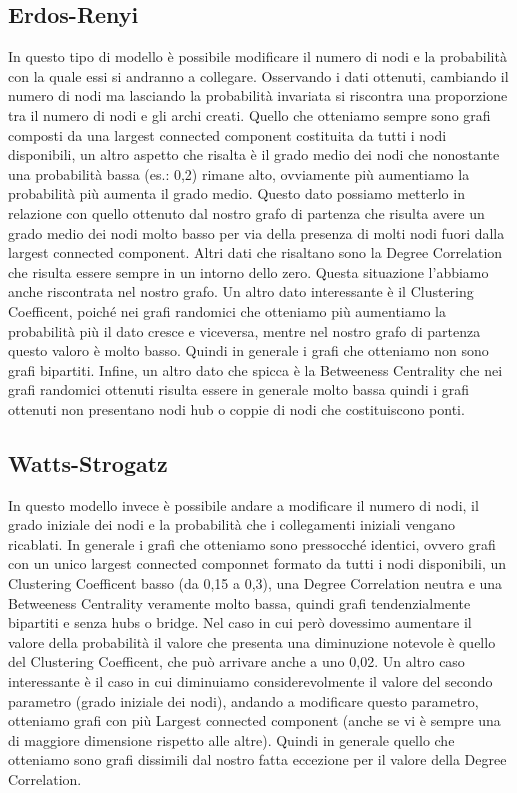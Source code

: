 \documentclass[a4paper]{article}
\begin{document}
\subsection{Erdos-Renyi}
In questo tipo di modello è possibile modificare il numero di nodi e la probabilità con la quale essi si andranno a collegare. Osservando i dati ottenuti, cambiando il numero di nodi ma lasciando la probabilità invariata si riscontra una proporzione tra il numero di nodi e gli archi creati. Quello che otteniamo sempre sono grafi composti da una largest connected component costituita da tutti i nodi disponibili, un altro aspetto che risalta è il grado medio dei nodi che nonostante una probabilità bassa (es.: 0,2) rimane alto, ovviamente più aumentiamo la probabilità più aumenta il grado medio. Questo dato possiamo metterlo in relazione con quello ottenuto dal nostro grafo di partenza che risulta avere un grado medio dei nodi molto basso per via della presenza di molti nodi fuori dalla largest connected component.
Altri dati che risaltano sono la Degree Correlation che risulta essere sempre in un intorno dello zero. Questa situazione l’abbiamo anche riscontrata nel nostro grafo.
Un altro dato interessante è il Clustering Coefficent, poiché nei grafi randomici che otteniamo più aumentiamo la probabilità più il dato cresce e viceversa, mentre nel nostro grafo di partenza questo valoro è molto basso. Quindi in generale i grafi che otteniamo non sono grafi bipartiti.
Infine, un altro dato che spicca è la Betweeness Centrality che nei grafi randomici ottenuti risulta essere in generale molto bassa quindi i grafi ottenuti non presentano nodi hub o coppie di nodi che costituiscono ponti.


\subsection{Watts-Strogatz}
In questo modello invece è possibile andare a modificare il numero di nodi, il grado iniziale dei nodi e la probabilità che i collegamenti iniziali vengano ricablati. In generale i grafi che otteniamo sono pressocché identici, ovvero grafi con un unico largest connected componnet formato da tutti i nodi disponibili, un Clustering Coefficent basso (da 0,15 a 0,3), una Degree Correlation neutra e una Betweeness Centrality veramente molto bassa, quindi grafi tendenzialmente bipartiti e senza hubs o bridge. Nel caso in cui però dovessimo aumentare il valore della probabilità il valore che presenta una diminuzione notevole è quello del Clustering Coefficent, che può arrivare anche a uno 0,02. Un altro caso interessante è il caso in cui diminuiamo considerevolmente il valore del secondo parametro (grado iniziale dei nodi), andando a modificare questo parametro, otteniamo grafi con più Largest connected component (anche se vi è sempre una di maggiore dimensione rispetto alle altre).
Quindi in generale quello che otteniamo sono grafi dissimili dal nostro fatta eccezione per il valore della Degree Correlation.
\end{document}
